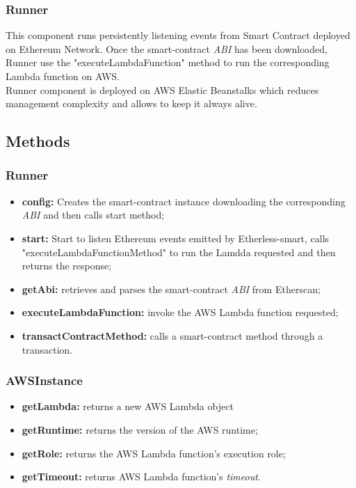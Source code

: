 \subsubsection{Runner}
This component runs persistently listening events from Smart Contract deployed on Ethereum Network. Once the smart-contract \textit{ABI\glo} has been downloaded, Runner use the "executeLambdaFunction" method to run the corresponding Lambda function on AWS.\\ Runner component is deployed on AWS Elastic Beanstalks which reduces management complexity and allows to keep it always alive. 


\subsection{Methods}
\subsubsection{Runner}
\begin{itemize}
	\item \textbf{config:} Creates the smart-contract instance downloading the corresponding \textit{ABI\glo} and then calls start method;
	\item \textbf{start:} Start to listen Ethereum events emitted by Etherless-smart, calls "executeLambdaFunctionMethod" to run the Lamdda requested and then returns the response;
	\item \textbf{getAbi:} retrieves and parses the smart-contract \textit{ABI\glo} from Etherscan;
	\item \textbf{executeLambdaFunction:} invoke the AWS Lambda function requested;
	\item \textbf{transactContractMethod:} calls a smart-contract method through a transaction.
\end{itemize}
\subsubsection{AWSInstance}
\begin{itemize}
	\item \textbf{getLambda:} returns a new AWS Lambda object
	\item \textbf{getRuntime:} returns the version of the AWS runtime;
	\item \textbf{getRole:} returns the AWS Lambda function's execution role;
	\item \textbf{getTimeout:} returns AWS Lambda function's \textit{timeout\glos}. 
\end{itemize}

